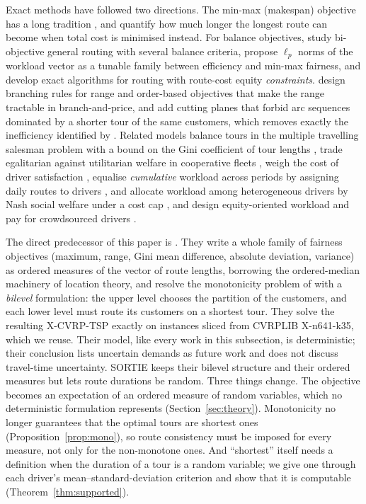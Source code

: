 \documentclass[11pt]{article}
\theoremstyle{definition}
\begin{document}
Exact methods have followed two directions. The min-max (makespan) objective
has a long tradition \citep{applegate2002solution}, and
\citet{bertazzi2015minmax} quantify how much longer the longest route can
become when total cost is minimised instead. For balance objectives,
\citet{halvorsen2016biobjective} study bi-objective general routing with
several balance criteria, \citet{bektas2020lp} propose $\ell_p$ norms
of the workload vector as a tunable family between efficiency and min-max
fairness, and \citet{agius2026solution} develop exact algorithms for routing
with route-cost equity \emph{constraints}. \citet{vanrossum2024branching,vanrossum2026efficient}
design branching rules for range and order-based objectives that make the
range tractable in branch-and-price, and \citet{vanrossum2026enforcing} add
cutting planes that forbid arc sequences dominated by a shorter tour of the
same customers, which removes exactly the inefficiency identified by
\citet{matl2018workload}. Related models balance tours in the multiple
travelling salesman problem with a bound on the Gini coefficient of tour
lengths \citep{bhadoriya2026equitable}, trade egalitarian against
utilitarian welfare in cooperative fleets \citep{lopezsanchez2024fair},
weigh the cost of driver satisfaction \citep{bruinink2025beyond}, equalise
\emph{cumulative} workload across periods by assigning daily routes to drivers
\citep{nekooghadirli2026workload}, and allocate workload among heterogeneous drivers by Nash social welfare under a
cost cap \citep{mahmoodian2025equitable}, and design equity-oriented workload
and pay for crowdsourced drivers \citep{sobhanan2026equity}.

The direct predecessor of this paper is \citet{ljubic2026fair}. They write a
whole family of fairness objectives (maximum, range, Gini mean difference,
absolute deviation, variance) as ordered measures of the vector of route
lengths, borrowing the ordered-median machinery of location theory, and
resolve the monotonicity problem of \citet{matl2018workload} with a
\emph{bilevel} formulation: the upper level chooses the partition of the
customers, and each lower level must route its customers on a shortest tour.
They solve the resulting X-CVRP-TSP exactly on instances sliced from CVRPLIB
X-n641-k35, which we reuse. Their model, like every work in this subsection,
is deterministic; their conclusion lists uncertain demands as future work
and does not discuss travel-time uncertainty. SORTIE keeps their bilevel
structure and their ordered measures but lets route durations be random.
Three things change. The objective becomes an expectation of an ordered
measure of random variables, which no deterministic formulation represents
(Section~\ref{sec:theory}). Monotonicity no longer guarantees that the
optimal tours are shortest ones (Proposition~\ref{prop:mono}), so route
consistency must be imposed for every measure, not only for the
non-monotone ones. And ``shortest'' itself needs a definition when the
duration of a tour is a random variable; we give one through each driver's
mean--standard-deviation criterion and show that it is computable
(Theorem~\ref{thm:supported}).
\end{document}
